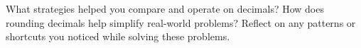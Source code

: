\documentclass[12pt]{article}
\begin{document}
\vspace{1em}

\begin{tcolorbox}[colframe=black!60, colback=white, 
coltitle=black, colbacktitle=black!15, fonttitle=\bfseries\Large, 
title=Reflection, halign title=center, left=10pt, right=10pt, top=10pt, bottom=100pt]
What strategies helped you compare and operate on decimals? How does rounding decimals help simplify real-world problems? Reflect on any patterns or shortcuts you noticed while solving these problems.
\end{tcolorbox}
\end{document}
